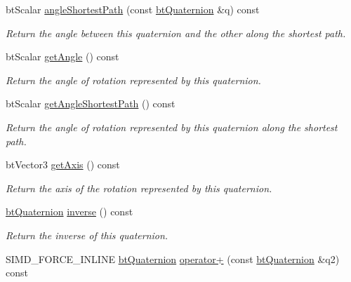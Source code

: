 \begin{DoxyCompactItemize}
bt\+Scalar \hyperlink{classbtQuaternion_a1a518843a038c9078deb0f83782ed8aa}{angle\+Shortest\+Path} (const \hyperlink{classbtQuaternion}{bt\+Quaternion} \&q) const
\begin{DoxyCompactList}\small\item\em Return the angle between this quaternion and the other along the shortest path. \end{DoxyCompactList}\item 
\mbox{\label{classbtQuaternion_a65235507c6319f3ea16c884231dff668}} 
bt\+Scalar \hyperlink{classbtQuaternion_a65235507c6319f3ea16c884231dff668}{get\+Angle} () const
\begin{DoxyCompactList}\small\item\em Return the angle of rotation represented by this quaternion. \end{DoxyCompactList}\item 
\mbox{\label{classbtQuaternion_abe995d64f60c0cd51278da798518933d}} 
bt\+Scalar \hyperlink{classbtQuaternion_abe995d64f60c0cd51278da798518933d}{get\+Angle\+Shortest\+Path} () const
\begin{DoxyCompactList}\small\item\em Return the angle of rotation represented by this quaternion along the shortest path. \end{DoxyCompactList}\item 
\mbox{\label{classbtQuaternion_add2fa918491b289939b8a829d3239b00}} 
bt\+Vector3 \hyperlink{classbtQuaternion_add2fa918491b289939b8a829d3239b00}{get\+Axis} () const
\begin{DoxyCompactList}\small\item\em Return the axis of the rotation represented by this quaternion. \end{DoxyCompactList}\item 
\mbox{\label{classbtQuaternion_ab2f4fcf35da5e846ceba91af625062f7}} 
\hyperlink{classbtQuaternion}{bt\+Quaternion} \hyperlink{classbtQuaternion_ab2f4fcf35da5e846ceba91af625062f7}{inverse} () const
\begin{DoxyCompactList}\small\item\em Return the inverse of this quaternion. \end{DoxyCompactList}\item 
S\+I\+M\+D\+\_\+\+F\+O\+R\+C\+E\+\_\+\+I\+N\+L\+I\+NE \hyperlink{classbtQuaternion}{bt\+Quaternion} \hyperlink{classbtQuaternion_a70cace8911befee9f0684391d16985d0}{operator+} (const \hyperlink{classbtQuaternion}{bt\+Quaternion} \&q2) const

\end{DoxyCompactItemize}
